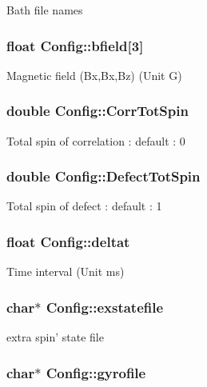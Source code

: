 Bath file names \hypertarget{structConfig_abf4c62b17ba762512fab9da0f1e193be}{
\subsubsection[{bfield}]{\setlength{\rightskip}{0pt plus 5cm}float Config\-::bfield\mbox{[}3\mbox{]}}}\label{structConfig_abf4c62b17ba762512fab9da0f1e193be}
Magnetic field (Bx,Bx,Bz) (Unit G) \hypertarget{structConfig_ac923676eaaf0a911eb890ee419c2b8e6}{
\subsubsection[{Corr\-Tot\-Spin}]{\setlength{\rightskip}{0pt plus 5cm}double Config\-::\-Corr\-Tot\-Spin}}\label{structConfig_ac923676eaaf0a911eb890ee419c2b8e6}
Total spin of correlation \-: default \-: 0 \hypertarget{structConfig_a716389cd405e9c041cd3ac7c7608ccdd}{
\subsubsection[{Defect\-Tot\-Spin}]{\setlength{\rightskip}{0pt plus 5cm}double Config\-::\-Defect\-Tot\-Spin}}\label{structConfig_a716389cd405e9c041cd3ac7c7608ccdd}
Total spin of defect \-: default \-: 1 \hypertarget{structConfig_a6539de558079f55df76dce79c4079b33}{
\subsubsection[{deltat}]{\setlength{\rightskip}{0pt plus 5cm}float Config\-::deltat}}\label{structConfig_a6539de558079f55df76dce79c4079b33}
Time interval (Unit ms) \hypertarget{structConfig_a70ec8756f364dc3d40201f951476137e}{
\subsubsection[{exstatefile}]{\setlength{\rightskip}{0pt plus 5cm}char$\ast$ Config\-::exstatefile}}\label{structConfig_a70ec8756f364dc3d40201f951476137e}
extra spin' state file \hypertarget{structConfig_a735f7f25b0847d08468616025a27ffe5}{
\subsubsection[{gyrofile}]{\setlength{\rightskip}{0pt plus 5cm}char$\ast$ Config\-::gyrofile}}\label{structConfig_a735f7f25b0847d08468616025a27ffe5}
